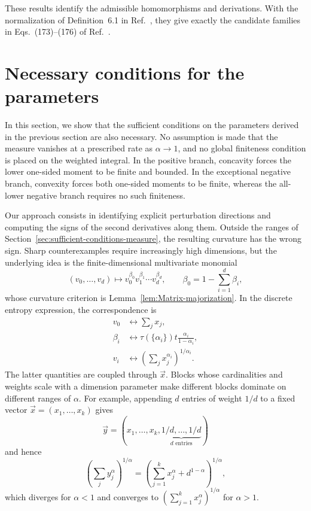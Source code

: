 \documentclass[aps,pra,11pt,onecolumn,nofootinbib,tightenlines]{revtex4-2}
\theoremstyle{definition}
\newcommand{\ParameterMainNormalization}{the normalization of Definition~6.1 in Ref.~\cite{rubboli2026complete}}
\newcommand{\ParameterMainFinalFamilies}{the candidate families in Eqs.~(173)--(176) of Ref.~\cite{rubboli2026complete}}
\begin{document}
These results identify the admissible homomorphisms and derivations.  With
\ParameterMainNormalization, they give exactly \ParameterMainFinalFamilies.

\section{Necessary conditions for the parameters}
\label{sec:necessary-conditions-measures}

In this section, we show that the sufficient conditions on the parameters derived
in the previous section are also necessary.  No assumption is made that the
measure vanishes at a prescribed rate as $\alpha\to1$, and no global finiteness
condition is placed on the weighted integral.  In the positive branch, concavity
forces the lower one-sided moment to be finite and bounded.  In the exceptional
negative branch, convexity forces both one-sided moments to be finite, whereas
the all-lower negative branch requires no such finiteness.

Our approach consists in identifying explicit perturbation directions and
computing the signs of the second derivatives along them.  Outside the ranges of
Section~\ref{sec:sufficient-conditions-measure}, the resulting curvature has the
wrong sign.  Sharp counterexamples require increasingly high dimensions, but the
underlying idea is the finite-dimensional multivariate monomial
\begin{equation}
\label{eq:multivariate-divergences-function}
 (v_0,\ldots,v_d)\longmapsto
 v_0^{\beta_0}v_1^{\beta_1}\cdots v_d^{\beta_d},
\qquad \beta_0=1-\sum_{i=1}^d\beta_i,
\end{equation}
whose curvature criterion is Lemma~\ref{lem:Matrix-majorization}.  In the
discrete entropy expression, the correspondence is
\begin{equation}
\begin{aligned}
v_0&\longleftrightarrow\sum_jx_j,\\
\beta_i&\longleftrightarrow
\tau(\{\alpha_i\})t\frac{\alpha_i}{1-\alpha_i},\\
v_i&\longleftrightarrow
\left(\sum_jx_j^{\alpha_i}\right)^{1/\alpha_i}.
\end{aligned}
\end{equation}
The latter quantities are coupled through $\vec{x}$.  Blocks whose cardinalities
and weights scale with a dimension parameter make different blocks dominate on
different ranges of $\alpha$.  For example, appending $d$ entries of weight
$1/d$ to a fixed vector $\vec{x}=(x_1,\ldots,x_k)$ gives
\[
\vec{y}=\left(
x_1,\ldots,x_k,
\underbrace{1/d,\ldots,1/d}_{d\text{ entries}}
\right)
\]
and hence
\begin{equation}
\left(\sum_jy_j^\alpha\right)^{1/\alpha}
=\left(\sum_{j=1}^k x_j^\alpha+d^{1-\alpha}\right)^{1/\alpha},
\end{equation}
which diverges for $\alpha<1$ and converges to
$(\sum_{j=1}^k x_j^\alpha)^{1/\alpha}$ for $\alpha>1$.
\end{document}

